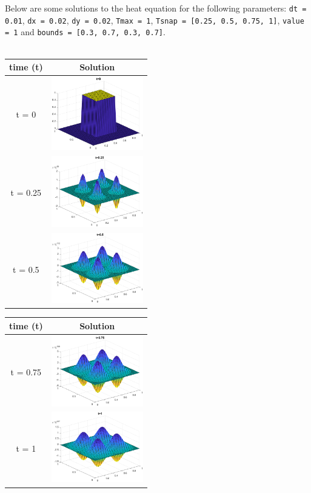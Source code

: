 \documentclass[]{report}
\def\incode#1{\texttt{#1}}
\begin{document}
	Below are some solutions to the heat equation for the following parameters: \incode{dt = 0.01}, \incode{dx = 0.02}, \incode{dy = 0.02}, \incode{Tmax = 1}, \incode{Tsnap = [0.25, 0.5, 0.75, 1]}, \incode{value = 1} and \incode{bounds = [0.3, 0.7, 0.3, 0.7]}. \\\\
	
	\begin{tabular}{|c|c|}
		\hline
		time (t) & Solution \\
		\hline
		t = 0 & \includegraphics[width=4cm]{heat/h1_t0.eps} \\
		\hline
		t = 0.25 & \includegraphics[width=4cm]{heat/h1_t1.eps} \\
		\hline
		t = 0.5 & \includegraphics[width=4cm]{heat/h1_t2.eps} \\
		\hline
	\end{tabular}
	\begin{tabular}{|c|c|}
		\hline
		time (t) & Solution \\
		\hline
		t = 0.75 & \includegraphics[width=4cm]{heat/h1_t3.eps} \\
		\hline
		t = 1 & \includegraphics[width=4cm]{heat/h1_t4.eps} \\ 
		\hline
	\end{tabular} 
\end{document}
